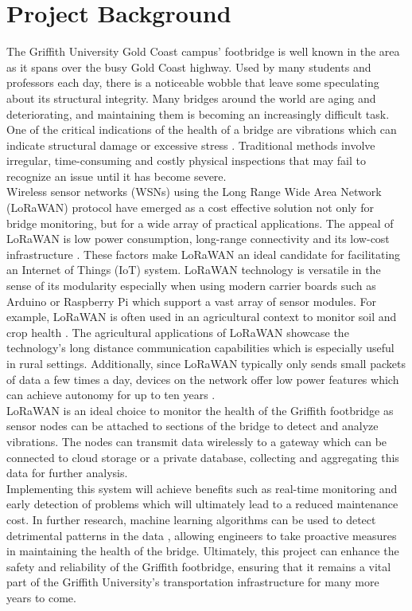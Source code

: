 \section{Project Background}

The Griffith University Gold Coast campus' footbridge is well known in the area as it spans over the busy Gold Coast highway. Used by many students and professors each day, there is a noticeable wobble that leave some speculating about its structural integrity. Many bridges around the world are aging and deteriorating, and maintaining them is becoming an increasingly difficult task. One of the critical indications of the health of a bridge are vibrations which can indicate structural damage or excessive stress \cite{BridgeVibrations}. Traditional methods involve irregular, time-consuming and costly physical inspections that may fail to recognize an issue until it has become severe.\\

Wireless sensor networks (WSNs) using the Long Range Wide Area Network (LoRaWAN) protocol have emerged as a cost effective solution not only for bridge monitoring, but for a wide array of practical applications. The appeal of LoRaWAN is low power consumption, long-range connectivity and its low-cost infrastructure \cite{LoRaAgriculture}. These factors make LoRaWAN an ideal candidate for facilitating an Internet of Things (IoT) system. LoRaWAN technology is versatile in the sense of its modularity especially when using modern carrier boards such as Arduino or Raspberry Pi which support a vast array of sensor modules. For example, LoRaWAN is often used in an agricultural context to monitor soil and crop health \cite{LoRaAgriculture2}. The agricultural applications of LoRaWAN showcase the technology's long distance communication capabilities which is especially useful in rural settings. Additionally, since LoRaWAN typically only sends small packets of data a few times a day, devices on the network offer low power features which can achieve autonomy for up to ten years \cite{LoRaWater}.\\

LoRaWAN is an ideal choice to monitor the health of the Griffith footbridge as sensor nodes can be attached to sections of the bridge to detect and analyze vibrations. The nodes can transmit data wirelessly to a gateway which can be connected to cloud storage or a private database, collecting and aggregating this data for further analysis.\\
Implementing this system will achieve benefits such as real-time monitoring and early detection of problems which will ultimately lead to a reduced maintenance cost. In further research, machine learning algorithms can be used to detect detrimental patterns in the data \cite{MachineL}, allowing engineers to take proactive measures in maintaining the health of the bridge. Ultimately, this project can enhance the safety and reliability of the Griffith footbridge, ensuring that it remains a vital part of the Griffith University's transportation infrastructure for many more years to come. 
